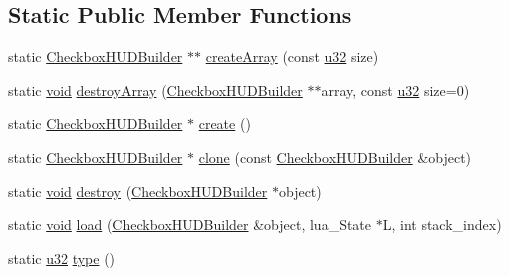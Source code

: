 \subsection*{Static Public Member Functions}
\begin{DoxyCompactItemize}
\item 
static \mbox{\hyperlink{classnjli_1_1_checkbox_h_u_d_builder}{Checkbox\+H\+U\+D\+Builder}} $\ast$$\ast$ \mbox{\hyperlink{classnjli_1_1_checkbox_h_u_d_builder_a8d672a58479cbd42b61be49167271d46}{create\+Array}} (const \mbox{\hyperlink{_util_8h_a10e94b422ef0c20dcdec20d31a1f5049}{u32}} size)
\item 
static \mbox{\hyperlink{_thread_8h_af1e856da2e658414cb2456cb6f7ebc66}{void}} \mbox{\hyperlink{classnjli_1_1_checkbox_h_u_d_builder_a7bf0a141fc13c9fd136756fa68d97a9b}{destroy\+Array}} (\mbox{\hyperlink{classnjli_1_1_checkbox_h_u_d_builder}{Checkbox\+H\+U\+D\+Builder}} $\ast$$\ast$array, const \mbox{\hyperlink{_util_8h_a10e94b422ef0c20dcdec20d31a1f5049}{u32}} size=0)
\item 
static \mbox{\hyperlink{classnjli_1_1_checkbox_h_u_d_builder}{Checkbox\+H\+U\+D\+Builder}} $\ast$ \mbox{\hyperlink{classnjli_1_1_checkbox_h_u_d_builder_a962c6257a10c98321603022823947ad2}{create}} ()
\item 
static \mbox{\hyperlink{classnjli_1_1_checkbox_h_u_d_builder}{Checkbox\+H\+U\+D\+Builder}} $\ast$ \mbox{\hyperlink{classnjli_1_1_checkbox_h_u_d_builder_a7fbcb6e45b8bacf62472a1f0afa5debc}{clone}} (const \mbox{\hyperlink{classnjli_1_1_checkbox_h_u_d_builder}{Checkbox\+H\+U\+D\+Builder}} \&object)
\item 
static \mbox{\hyperlink{_thread_8h_af1e856da2e658414cb2456cb6f7ebc66}{void}} \mbox{\hyperlink{classnjli_1_1_checkbox_h_u_d_builder_a5b5a554a3ce28b4a0a913f2e2239d193}{destroy}} (\mbox{\hyperlink{classnjli_1_1_checkbox_h_u_d_builder}{Checkbox\+H\+U\+D\+Builder}} $\ast$object)
\item 
static \mbox{\hyperlink{_thread_8h_af1e856da2e658414cb2456cb6f7ebc66}{void}} \mbox{\hyperlink{classnjli_1_1_checkbox_h_u_d_builder_a19f2bc2032760d15811153263e49cb74}{load}} (\mbox{\hyperlink{classnjli_1_1_checkbox_h_u_d_builder}{Checkbox\+H\+U\+D\+Builder}} \&object, lua\+\_\+\+State $\ast$L, int stack\+\_\+index)
\item 
static \mbox{\hyperlink{_util_8h_a10e94b422ef0c20dcdec20d31a1f5049}{u32}} \mbox{\hyperlink{classnjli_1_1_checkbox_h_u_d_builder_a7cd1bf586fa32ec0679ba022b82118fe}{type}} ()
\end{DoxyCompactItemize}
